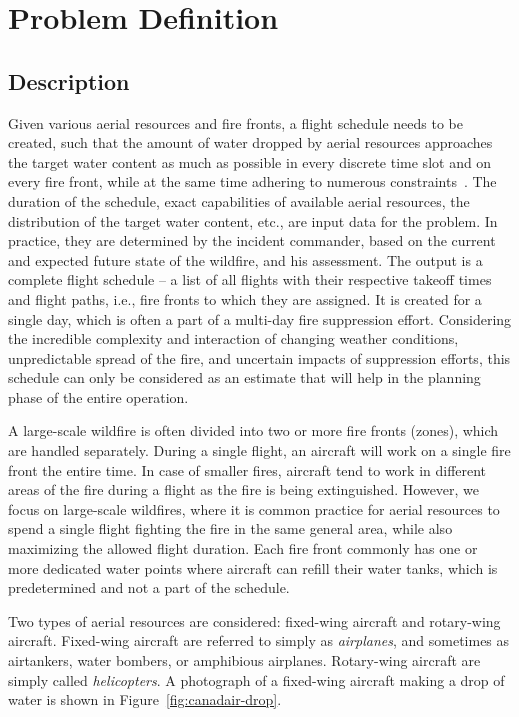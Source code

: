 \chapter{Problem Definition}

\section{Description}

Given various aerial resources and fire fronts, a flight schedule needs to be created, such that the amount of water dropped by aerial resources approaches the target water content as much as possible in every discrete time slot and on every fire front, while at the same time adhering to numerous constraints~\cite{SkorinKapov/ILP}.
The duration of the schedule, exact capabilities of available aerial resources, the distribution of the target water content, etc., are input data for the problem.
In practice, they are determined by the incident commander, based on the current and expected future state of the wildfire, and his assessment.
The output is a complete flight schedule -- a list of all flights with their respective takeoff times and flight paths, i.e., fire fronts to which they are assigned.
It is created for a single day, which is often a part of a multi-day fire suppression effort.
Considering the incredible complexity and interaction of changing weather conditions, unpredictable spread of the fire, and uncertain impacts of suppression efforts, this schedule can only be considered as an estimate that will help in the planning phase of the entire operation.

A large-scale wildfire is often divided into two or more fire fronts (zones), which are handled separately.
During a single flight, an aircraft will work on a single fire front the entire time.
In case of smaller fires, aircraft tend to work in different areas of the fire during a flight as the fire is being extinguished.
However, we focus on large-scale wildfires, where it is common practice for aerial resources to spend a single flight fighting the fire in the same general area, while also maximizing the allowed flight duration.
Each fire front commonly has one or more dedicated water points where aircraft can refill their water tanks, which is predetermined and not a part of the schedule.

Two types of aerial resources are considered: fixed-wing aircraft and rotary-wing aircraft.
Fixed-wing aircraft are referred to simply as \textit{airplanes}, and sometimes as airtankers, water bombers, or amphibious airplanes.
Rotary-wing aircraft are simply called \textit{helicopters}.
A photograph of a fixed-wing aircraft making a drop of water is shown in Figure~\ref{fig:canadair-drop}.

